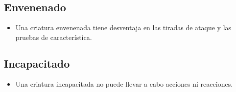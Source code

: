\documentclass[10pt,twoside,twocolumn,openany]{dndbook}
\begin{document}
\subsection*{Envenenado}
\begin{itemize}
  \item Una criatura envenenada tiene desventaja en las tiradas de ataque y las pruebas de característica.
\end{itemize}

\subsection*{Incapacitado}
\begin{itemize}
  \item Una criatura incapacitada no puede llevar a cabo acciones ni reacciones.
\end{itemize}



\newpage
\mbox{}

\newpage
\thispagestyle{empty}
\mbox{}

\begin{figure}
\end{figure}
\end{document}
